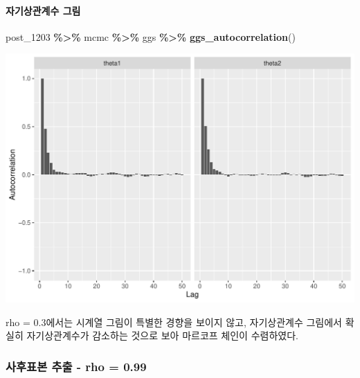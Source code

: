 \documentclass[
]{article}
\newenvironment{Shaded}{\begin{snugshade}}{\end{snugshade}}
\newcommand{\FunctionTok}[1]{\textcolor[rgb]{0.13,0.29,0.53}{\textbf{#1}}}
\newcommand{\NormalTok}[1]{#1}
\newcommand{\SpecialCharTok}[1]{\textcolor[rgb]{0.81,0.36,0.00}{\textbf{#1}}}
\begin{document}
\paragraph{자기상관계수
그림}\label{uxc790uxae30uxc0c1uxad00uxacc4uxc218-uxadf8uxb9bc}

\begin{Shaded}
\begin{Highlighting}[]
\NormalTok{post\_1203 }\SpecialCharTok{\%\textgreater{}\%}\NormalTok{ mcmc }\SpecialCharTok{\%\textgreater{}\%}\NormalTok{ ggs }\SpecialCharTok{\%\textgreater{}\%} \FunctionTok{ggs\_autocorrelation}\NormalTok{()}
\end{Highlighting}
\end{Shaded}

\begin{center}\includegraphics[width=0.8\linewidth]{Bayes_stat_hw3_files/figure-latex/unnamed-chunk-7-1} \end{center}

rho = 0.3에서는 시계열 그림이 특별한 경향을 보이지 않고, 자기상관계수
그림에서 확실히 자기상관계수가 감소하는 것으로 보아 마르코프 체인이
수렴하였다.

\subsubsection{사후표본 추출 - rho =
0.99}\label{uxc0acuxd6c4uxd45cuxbcf8-uxcd94uxcd9c---rho-0.99}
\end{document}
